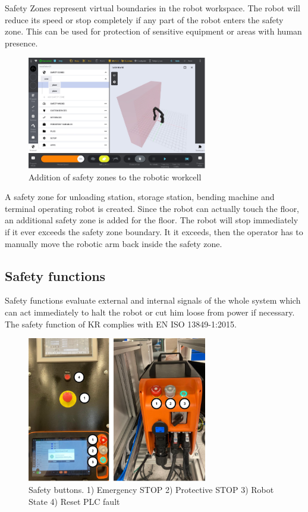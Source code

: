 Safety Zones represent virtual boundaries in the robot workspace. The robot will reduce its speed or stop
completely if any part of the robot enters the safety zone. This can be used for protection of sensitive
equipment or areas with human presence. \cite[page 96]{kassow-software-manual}


\begin{figure}[h]
    \centering
    \includegraphics[width=0.7\textwidth]{figures/safety-zones.png}
    \caption{Addition of safety zones to the robotic workcell}
    \label{fig:safety-zones}
\end{figure}

A safety zone for unloading station, storage station, bending machine and terminal operating
robot is created. Since the
robot can actually touch the floor, an additional safety zone is added for the floor. 
The robot will stop immediately if it ever exceeds the safety zone boundary. It it exceeds, 
then the operator
has to manually move the robotic arm back inside the safety zone. 

\subsection{Safety functions}
\label{subsec:safety-functions}
Safety functions evaluate external and internal signals of the whole system which can act immediately to
halt the robot or cut him loose from power if necessary. 
The safety function of KR complies with EN ISO 13849-1:2015. \cite{ISO13849}
\cite[page 13]{kassow-software-manual}

\begin{figure}[h]
    \centering
    \includegraphics[width=0.7\textwidth]{figures/safety-buttons.png}
    \caption{Safety buttons. 1) Emergency STOP 2) Protective STOP 3) Robot State 4) Reset PLC fault}
    \label{fig:safety-buttons}
\end{figure}

